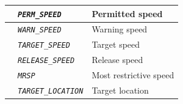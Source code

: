 \begin{itemize}
\begin{longtable}{|l|l|l|}
			\hline

			&	\begin{minipage}[t]{0.40\linewidth} \emph{\texttt{PERM\_SPEED}} \end{minipage}
			&	\begin{minipage}[t]{0.38\linewidth}Permitted speed \end{minipage} \\

			\hline

			&	\begin{minipage}[t]{0.40\linewidth} \emph{\texttt{WARN\_SPEED}} \end{minipage}
			&	\begin{minipage}[t]{0.38\linewidth} Warning speed \end{minipage} \\

			\hline

			&	\begin{minipage}[t]{0.40\linewidth} \emph{\texttt{TARGET\_SPEED}} \end{minipage}
			&	\begin{minipage}[t]{0.38\linewidth} Target speed \end{minipage} \\

			\hline

			&	\begin{minipage}[t]{0.40\linewidth} \emph{\texttt{RELEASE\_SPEED}} \end{minipage}
			&	\begin{minipage}[t]{0.38\linewidth} Release speed \end{minipage} \\

			\hline

			&	\begin{minipage}[t]{0.40\linewidth} \emph{\texttt{MRSP}} \end{minipage}
			&	\begin{minipage}[t]{0.38\linewidth} Most restrictive speed \end{minipage} \\

			\hline

			&	\begin{minipage}[t]{0.40\linewidth} \emph{\texttt{TARGET\_LOCATION}} \end{minipage}
			&	\begin{minipage}[t]{0.38\linewidth} Target location \end{minipage} \\


\end{longtable}
\end{itemize}
